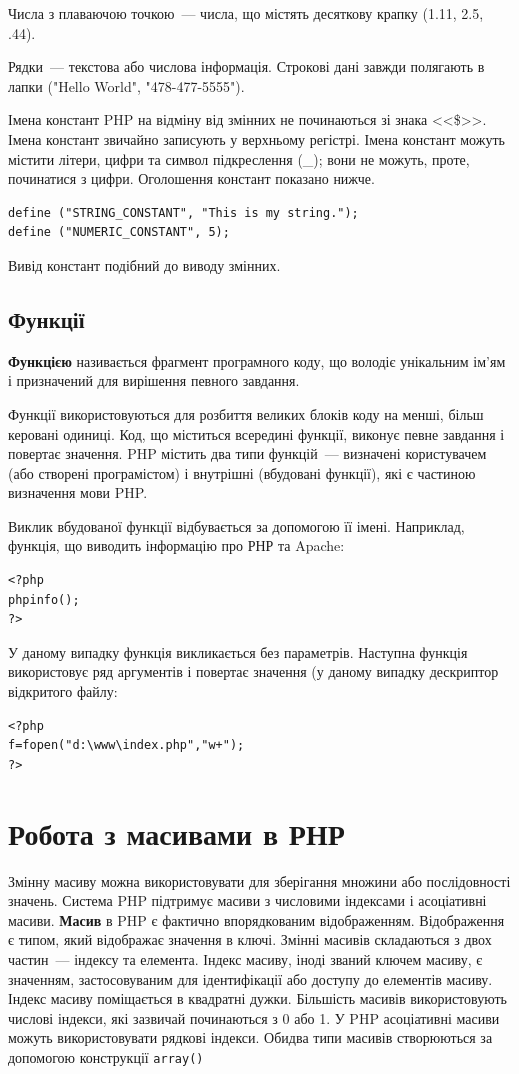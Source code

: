 Числа з плаваючою точкою~--- числа, що містять десяткову крапку (1.11, 2.5, .44).

Рядки~--- текстова або числова інформація. Строкові дані завжди полягають в лапки ("Hello World", "478-477-5555").

Імена констант PHP на відміну від змінних не починаються зі знака <<\$>>. Імена констант звичайно записують у верхньому регістрі. Імена констант можуть містити літери, цифри та символ підкреслення (\_); вони не можуть, проте, починатися з цифри. Оголошення констант показано нижче.
\begin{verbatim}
define ("STRING_CONSTANT", "This is my string."); 
define ("NUMERIC_CONSTANT", 5); 
\end{verbatim}
Вивід констант подібний до виводу змінних.
\subsection*{Функції}
\textbf{Функцією} називається фрагмент програмного коду, що володіє унікальним ім'ям і призначений для вирішення певного завдання. 

Функції використовуються для розбиття великих блоків коду на менші, більш керовані одиниці. Код, що міститься всередині функції, виконує певне завдання і повертає значення. PHP містить два типи функцій~--- визначені користувачем (або створені програмістом) і внутрішні (вбудовані функції), які є частиною визначення мови PHP.

Виклик вбудованої функції відбувається за допомогою її імені. Наприклад, функція, що виводить інформацію про РНР та Apache:
\begin{verbatim}
<?php
phpinfo();
?>
\end{verbatim}
У даному випадку функція викликається без параметрів. Наступна функція використовує ряд аргументів і повертає значення (у даному випадку дескриптор відкритого файлу:
\begin{verbatim}
<?php
f=fopen("d:\www\index.php","w+");
?>
\end{verbatim}
\pagebreak[3]
\section{Робота з масивами в РНР}
\nopagebreak[4]
Змінну масиву можна використовувати для зберігання множини або послідовності значень. Система PHP підтримує масиви з числовими індексами і асоціативні масиви. \textbf{Масив} в PHP є фактично впорядкованим відображенням. Відображення є типом, який відображає значення в ключі. Змінні масивів складаються з двох частин~--- індексу та елемента. Індекс масиву, іноді званий ключем масиву, є значенням, застосовуваним для ідентифікації або доступу до елементів масиву. Індекс масиву поміщається в квадратні дужки. Більшість масивів використовують числові індекси, які зазвичай починаються з 0 або 1. У PHP асоціативні масиви можуть використовувати рядкові індекси. Обидва типи масивів створюються за допомогою конструкції  \verb|array()|
